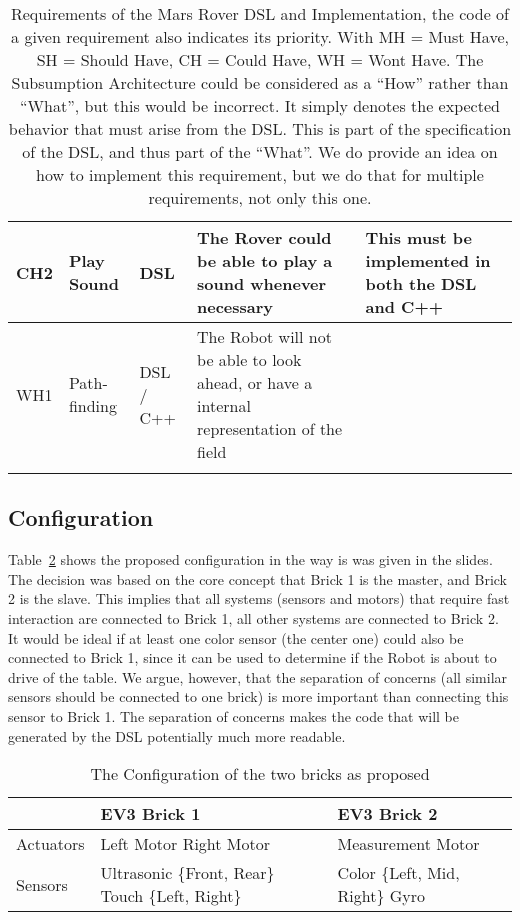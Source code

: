 \documentclass{scrartcl}
\begin{document}
\begin{longtable}{|l|p{1.7cm}|p{1cm}|p{4cm}|p{4cm}|}
	CH2 & Play Sound & DSL & The Rover could be able to play a sound whenever necessary & This must be implemented in both the DSL and C++ \\\hline
	WH1 & Path-finding & DSL / C++ & The Robot will not be able to look ahead, or have a internal representation of the field & \\\hline
	\caption{Requirements of the Mars Rover DSL and Implementation, the code of a given requirement also indicates its priority. With MH = Must Have, SH = Should Have, CH = Could Have, WH = Wont Have.
		The Subsumption Architecture could be considered as a ``How'' rather than ``What'', but this would be incorrect.
		It simply denotes the expected behavior that must arise from the DSL.
		This is part of the specification of the DSL, and thus part of the ``What''.
		We do provide an idea on how to implement this requirement, but we do that for multiple requirements, not only this one.}
\label{tab:requirements}
\end{longtable}

\subsection{Configuration}
Table~\ref{tab:config_p} shows the proposed configuration in the way is was given in the slides.
The decision was based on the core concept that Brick 1 is the master, and Brick 2 is the slave.
This implies that all systems (sensors and motors) that require fast interaction are connected to Brick 1, all other systems are connected to Brick 2.
It would be ideal if at least one color sensor (the center one) could also be connected to Brick 1, since it can be used to determine if the Robot is about to drive of the table.
We argue, however, that the separation of concerns (all similar sensors should be connected to one brick) is more important than connecting this sensor to Brick 1.
The separation of concerns makes the code that will be generated by the DSL potentially much more readable.
\begin{table}
	\centering
	\begin{tabular}{|l|p{5cm}|p{5cm}|}
		\hline
		& EV3 Brick 1 & EV3 Brick 2 \\\hline
		Actuators & Left Motor \newline Right Motor & Measurement Motor \\\hline
		Sensors & Ultrasonic \{Front, Rear\} \newline Touch \{Left, Right\} & Color \{Left, Mid, Right\} \newline Gyro \\\hline
	\end{tabular}
	\caption{The Configuration of the two bricks as proposed}
	\label{tab:config_p}
\end{table}
\end{document}
